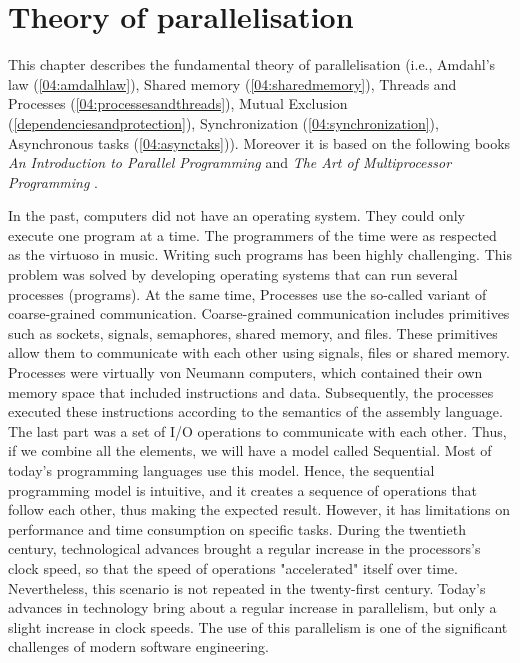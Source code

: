 \chapter{Theory of parallelisation}
\label{03:chapter:title}

This chapter describes the fundamental theory of parallelisation (i.e., Amdahl's law (\ref{04:amdalhlaw}), Shared memory (\ref{04:sharedmemory}), Threads and Processes (\ref{04:processesandthreads}), Mutual Exclusion (\ref{dependenciesandprotection}), Synchronization (\ref{04:synchronization}), Asynchronous tasks (\ref{04:asynctaks})).
Moreover it is based on the following books \emph{An Introduction to Parallel Programming} \cite{introductionToParallelProgramming} and \emph{The Art of Multiprocessor Programming} \cite{artOfMultiprocessorProgramming}.

In the past, computers did not have an operating system.
They could only execute one program at a time.
The programmers of the time were as respected as the virtuoso in music.
Writing such programs has been highly challenging.
This problem was solved by developing operating systems that can run several processes (programs).
At the same time, Processes use the so-called variant of coarse-grained communication.
Coarse-grained communication includes primitives such as sockets, signals, semaphores, shared memory, and files.
These primitives allow them to communicate with each other using signals, files or shared memory.
Processes were virtually von Neumann computers, which contained their own memory space that included instructions and data.
Subsequently, the processes executed these instructions according to the semantics of the assembly language.
The last part was a set of I/O operations to communicate with each other.
Thus, if we combine all the elements, we will have a model called Sequential.
Most of today's programming languages use this model.
Hence, the sequential programming model is intuitive, and it creates a sequence of operations that follow each other, thus making the expected result.
However, it has limitations on performance and time consumption on specific tasks.
During the twentieth century, technological advances brought a regular increase in the processors's clock speed, so that the speed of operations "accelerated" itself over time.
Nevertheless, this scenario is not repeated in the twenty-first century.
Today's advances in technology bring about a regular increase in parallelism, but only a slight increase in clock speeds.
The use of this parallelism is one of the significant challenges of modern software engineering.

